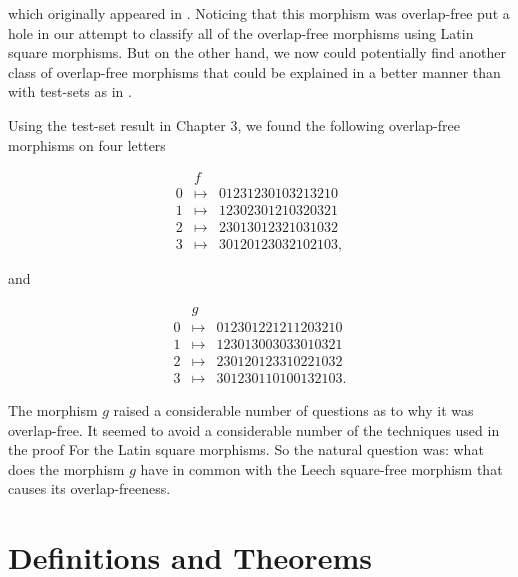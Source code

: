 \documentclass[12pt]{amsart}
\theoremstyle{definition}
\theoremstyle{plain}
\theoremstyle{nameit}
\theoremstyle{plain}
\begin{document}
\begin{onehalfspace}
\noindent
which originally appeared in \cite{leech}. Noticing that this morphism was overlap-free put a hole in our
attempt to classify all of the overlap-free morphisms using Latin square morphisms. But on the other
hand, we now could potentially find another class of overlap-free morphisms that could be explained in a
better manner than with test-sets as in \cite{ric_testsets}.

Using the test-set result in Chapter 3, we found the following overlap-free morphisms on four letters

\begin{singlespace}
\begin{eqnarray*}
&f&\\
0 & \mapsto & 0123 1230 1 0321 3210\\
1 & \mapsto & 1230 2301 2 1032 0321\\
2 & \mapsto & 2301 3012 3 2103 1032\\
3 & \mapsto & 3012 0123 0 3210 2103,
\end{eqnarray*}
\end{singlespace}

\noindent
and

\begin{singlespace}
\begin{eqnarray*}
&g&\\
0 & \mapsto & 0123 0122121120 3210\\
1 & \mapsto & 1230 1300303301 0321\\
2 & \mapsto & 2301 2012331022 1032\\
3 & \mapsto & 3012 3011010013 2103.
\end{eqnarray*}
\end{singlespace}

\noindent
The morphism $g$ raised a considerable number of questions as to why it was overlap-free. It seemed to
avoid a considerable number of the techniques used in the proof For the Latin square morphisms. So the
natural question was: what does the morphism $g$ have in common with the Leech square-free
morphism that causes its overlap-freeness.


\section{Definitions and Theorems}


\end{onehalfspace}
\end{document}
